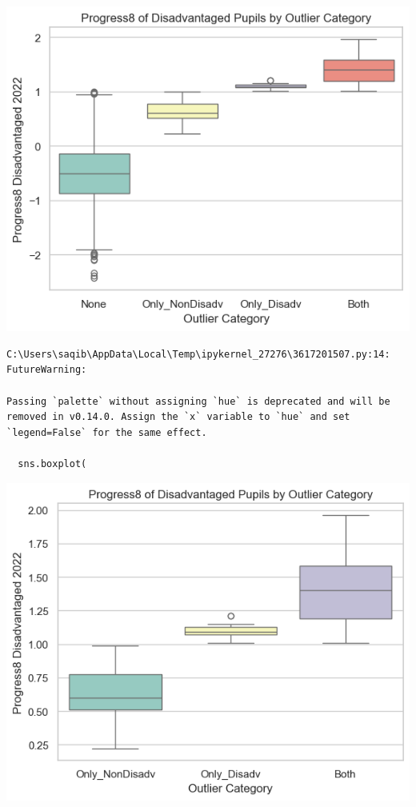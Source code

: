 \documentclass[
  letterpaper,
  DIV=11,
  numbers=noendperiod]{scrartcl}
\begin{document}
\includegraphics{P4DS_A2_Data_Analysis_Project_files/figure-pdf/cell-81-output-2.png}

\begin{verbatim}
C:\Users\saqib\AppData\Local\Temp\ipykernel_27276\3617201507.py:14: FutureWarning: 

Passing `palette` without assigning `hue` is deprecated and will be removed in v0.14.0. Assign the `x` variable to `hue` and set `legend=False` for the same effect.

  sns.boxplot(
\end{verbatim}

\includegraphics{P4DS_A2_Data_Analysis_Project_files/figure-pdf/cell-81-output-4.png}
\end{document}
